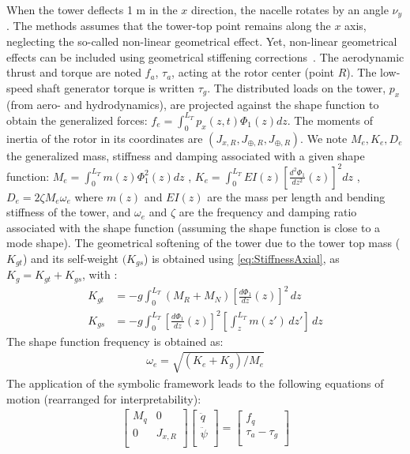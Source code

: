 \documentclass[wes, manuscript]{copernicus}
\begin{document}
When the tower deflects 1 \unit{m} in the $x$ direction, the nacelle rotates by an angle $\nu_y$.
The methods assumes that the tower-top point remains along the $x$ axis, neglecting the so-called non-linear geometrical effect.
Yet, non-linear geometrical effects can be included using geometrical stiffening corrections~\citep{branlard:2019flex}.
The aerodynamic thrust and torque are noted $f_a$, $\tau_a$, acting at the rotor center (point $R$).
The low-speed shaft generator torque is written $\tau_g$.
The distributed loads on the tower, $p_x$ (from aero- and hydrodynamics), are projected against the shape function to obtain the generalized forces: 
  $f_e=\int_0^{L_T} p_x(z,t)\Phi_1(z) dz $.
The moments of inertia of the rotor in its coordinates are $(J_{x,R}, J_{\oplus,R}, J_{\oplus,R})$.
    We note $M_e, K_e, D_e$  the generalized mass, stiffness and damping associated with a given shape function:
$M_e=\int_0^{L_T} m(z) \Phi_1^2(z) dz$
    ,
  $K_e=\int_0^{L_T} EI(z) \left[\frac{d^2\Phi_1}{dz^2}(z)\right]^2 dz$
,
    $D_e= 2 \zeta M_e \omega_e$
where $m(z)$ and $EI(z)$ are the mass per length and bending stiffness of the tower, and $\omega_e$  and $\zeta$ are the frequency and damping ratio associated with the shape function (assuming the shape function is close to a mode shape).
The geometrical softening of the tower due to the tower top mass ($K_{gt}$) and its self-weight $(K_{gs}$) is obtained using \autoref{eq:StiffnessAxial}, as $K_g= K_{gt}+K_{gs}$, with :
\begin{align}
  K_{gt}&=- g \int_0^{L_T} (M_{R}+M_N)\left[\frac{d\Phi_1}{dz}(z)\right]^2\, dz
     \\
  K_{gs}&=- g \int_0^{L_T} \left[\frac{d\Phi_1}{dz}(z)\right]^2 \left[\int_z^{L_T} m(z')\,dz' \right]  \, dz
\end{align}
The shape function frequency is obtained as:
\begin{align}
    \omega_e = \sqrt{(K_e+K_g)/M_e}
\end{align}
The application of the symbolic framework leads to the following equations of motion (rearranged for interpretability):
\begin{align}
    \begin{bmatrix}
    M_q & 0 \\ 
    0 & J_{x,R} \\ 
    \end{bmatrix}
    \begin{bmatrix}
    \ddot{q}\\
    \ddot{\psi}\\
    \end{bmatrix}
    =
    \begin{bmatrix}
    f_q \\
    \tau_a-\tau_g\\
    \end{bmatrix}
    \label{eq:EOM2DOF}
\end{align}
\end{document}

